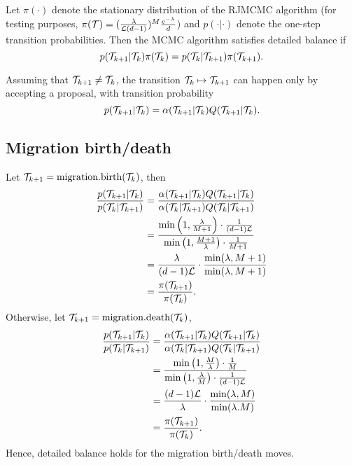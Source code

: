 Let $\pi(\cdot)$ denote the stationary distribution of the RJMCMC algorithm (for testing purposes, $\pi(\mathcal{T}) = (\frac{\lambda}{\mathcal{L} (d-1)})^M \frac{e^{-\lambda}}{d}$) and $p(\cdot | \cdot)$ denote the one-step transition probabilities. Then the MCMC algorithm satisfies detailed balance if
	\[
		p(\mathcal{T}_{k+1} | \mathcal{T}_k) \pi (\mathcal{T}_k) = p(\mathcal{T}_k | \mathcal{T}_{k+1}) \pi(\mathcal{T}_{k+1}).
	\]
	
Assuming that $\mathcal{T}_{k+1} \neq \mathcal{T}_k$, the transition $\mathcal{T}_k \mapsto \mathcal{T}_{k+1}$ can happen only by accepting a proposal, with transition probability
	\[
		p(\mathcal{T}_{k+1} | \mathcal{T}_k) = \alpha (\mathcal{T}_{k+1} | \mathcal{T}_k) Q(\mathcal{T}_{k+1} | \mathcal{T}_k).
	\]
	
	\subsection{Migration birth/death}
		Let $\mathcal{T}_{k+1} = \text{migration.birth}(\mathcal{T}_k)$, then
			\begin{align*}
				\frac{p(\mathcal{T}_{k+1} | \mathcal{T}_k)}{p(\mathcal{T}_k | \mathcal{T}_{k+1})} & = \frac{\alpha (\mathcal{T}_{k+1} | \mathcal{T}_k) Q(\mathcal{T}_{k+1} | \mathcal{T}_k)}{\alpha(\mathcal{T}_k | \mathcal{T}_{k+1}) Q(\mathcal{T}_k |\mathcal{T}_{k+1})}\\
					& = \frac{\min \left( 1, \frac{\lambda}{M+1} \right) \cdot \frac{1}{(d-1) \mathcal{L}}}{\min\left( 1, \frac{M+1}{\lambda} \right) \cdot \frac{1}{M+1}} \\
					& = \frac{\lambda}{(d-1) \mathcal{L}} \cdot \frac{\min(\lambda, M+1)}{\min(\lambda, M+1)} \\
					& = \frac{\pi (\mathcal{T}_{k+1})}{\pi(\mathcal{T}_k)}.
			\end{align*}
		Otherwise, let $\mathcal{T}_{k+1} = \text{migration.death}(\mathcal{T}_k)$,
			\begin{align*}
				\frac{p(\mathcal{T}_{k+1} | \mathcal{T}_k)}{p(\mathcal{T}_k | \mathcal{T}_{k+1})} & = \frac{\alpha (\mathcal{T}_{k+1} | \mathcal{T}_k) Q(\mathcal{T}_{k+1} | \mathcal{T}_k)}{\alpha(\mathcal{T}_k | \mathcal{T}_{k+1}) Q(\mathcal{T}_k |\mathcal{T}_{k+1})} \\
					& = \frac{\min \left( 1, \frac{M}{\lambda} \right) \cdot \frac{1}{M}}{\min\left( 1, \frac{\lambda}{M} \right) \cdot \frac{1}{(d-1) \mathcal{L}}} \\
					& = \frac{(d-1) \mathcal{L}}{\lambda} \cdot \frac{\min (\lambda, M)}{\min (\lambda. M)} \\
					& = \frac{\pi (\mathcal{T}_{k+1})}{\pi(\mathcal{T}_k)}.
			\end{align*}
		Hence, detailed balance holds for the migration birth/death moves.
		
